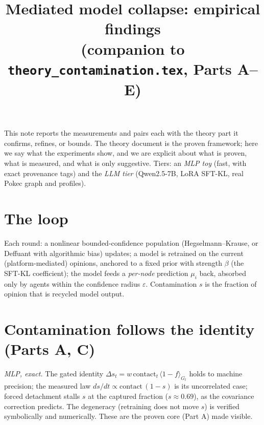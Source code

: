 \documentclass[11pt]{article}
\title{Mediated model collapse: empirical findings\\
\large(companion to \texttt{theory\_contamination.tex}, Parts A--E)}
\author{}
\date{}
\begin{document}
\maketitle

\noindent This note reports the measurements and pairs each with the theory part it
confirms, refines, or bounds. The theory document is the proven framework; here we say
what the experiments show, and we are explicit about what is proven, what is measured,
and what is only suggestive. Tiers: an \emph{MLP toy} (fast, with exact provenance tags)
and the \emph{LLM tier} (Qwen2.5-7B, LoRA SFT-KL, real Pokec graph and profiles).

\section{The loop}
Each round: a nonlinear bounded-confidence population (Hegselmann--Krause, or
Deffuant with algorithmic bias) updates; a model is retrained on the current
(platform-mediated) opinions, anchored to a fixed prior with strength $\beta$ (the
SFT-KL coefficient); the model feeds a \emph{per-node} prediction $\mu_i$ back, absorbed
only by agents within the confidence radius $\varepsilon$. Contamination $s$ is the
fraction of opinion that is recycled model output.

\section{Contamination follows the identity (Parts A, C)}
\emph{MLP, exact.} The gated identity
$\Delta s_t = w\,\mathrm{contact}_t\,\langle1-f\rangle_{G_t}$ holds to machine precision;
the measured law $ds/dt\propto\mathrm{contact}\,(1-s)$ is its uncorrelated case; forced
detachment stalls $s$ at the captured fraction ($s\approx0.69$), as the covariance
correction predicts. The degeneracy (retraining does not move $s$) is verified
symbolically and numerically. These are the proven core (Part A) made visible.
\end{document}
